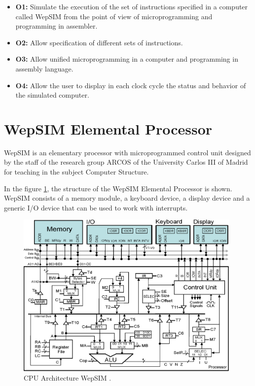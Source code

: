\begin{itemize}

\item \textbf{O1:} Simulate the execution of the set of instructions specified in a computer called WepSIM from the point of view of microprogramming and programming in assembler.

\item \textbf{O2:} Allow specification of different sets of instructions.

\item \textbf{O3:} Allow unified microprogramming in a computer and programming in assembly language.


\item \textbf{O4:} Allow the user to display in each clock cycle the status and behavior of the simulated computer.

\end{itemize}

\section*{WepSIM Elemental Processor}

WepSIM is an elementary processor with microprogrammed control unit designed by the staff of the research group ARCOS of the University Carlos III of Madrid for teaching in the subject Computer Structure.

In the figure \ref{fig:wepsimCPU_figure_summary}, the structure of the WepSIM Elemental Processor is shown. WepSIM consists of a memory module, a keyboard device, a display device and a generic I/O device that can be used to work with interrupts.

\begin{figure}[htbp]
 	\centering
 	\includegraphics[width=11cm]{figures/processor6}
 	\caption{CPU Architecture WepSIM .}
	\label{fig:wepsimCPU_figure_summary}
\end{figure}

